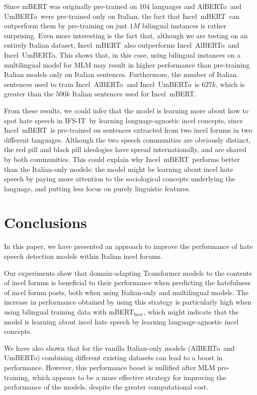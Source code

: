 \documentclass[11pt]{article}
\newcommand{\dsITclassification}{IFS-IT}
\newcommand{\mbert}{\mbox{mBERT$_{base}$}}
\newcommand{\imbert}{\mbox{Incel mBERT}}
\newcommand{\umbert}{\mbox{UmBERTo}}
\newcommand{\albert}{\mbox{AlBERTo}}
\newcommand{\iumbert}{\mbox{Incel UmBERTo}}
\newcommand{\ialbert}{\mbox{Incel AlBERTo}}
\begin{document}
Since mBERT was originally pre-trained on 104 languages and \albert\, and \umbert\, were pre-trained only on Italian, the fact that \imbert\, can outperform them by pre-training on just $1M$ bilingual instances is rather surprising. Even more interesting is the fact that, although we are testing on an entirely Italian dataset, \imbert\, also outperforms \ialbert\, and \iumbert. This shows that, in this case, using bilingual instances on a multilingual model for MLM may result in higher performance than pre-training Italian models only on Italian sentences. Furthermore, the number of Italian sentences used to train \ialbert\, and \iumbert\, is $627k$, which is greater than the $500k$ Italian sentences used for \imbert.

From these results, we could infer that the model is learning more about how to spot hate speech in \dsITclassification\, by learning language-agnostic incel concepts, since \imbert\, is pre-trained on sentences extracted from two incel forums in two different languages. Although the two speech communities are obviously distinct, the red pill and black pill ideologies have spread internationally, and are shared by both communities. This could explain why \imbert\, performs better than the Italian-only models: the model might be learning about incel hate speech by paying more attention to the sociological concepts underlying the language, and putting less focus on purely linguistic features.


\section{Conclusions}

In this paper, we have presented an approach to improve the performance of hate speech detection models within Italian incel forums.

Our experiments show that domain-adapting Transformer models to the contents of incel forums is beneficial to their performance when predicting the hatefulness of incel forum posts, both when using Italian-only and multilingual models. The increase in performance obtained by using this strategy is particularly high when using bilingual training data with \mbert, which might indicate that the model is learning about incel hate speech by learning language-agnostic incel concepts.

We have also shown that for the vanilla Italian-only models (\albert\, and \umbert) combining different existing datasets can lead to a boost in performance. However, this performance boost is nullified after MLM pre-training, which appears to be a more effective strategy for improving the performance of the models, despite the greater computational cost.
\end{document}
